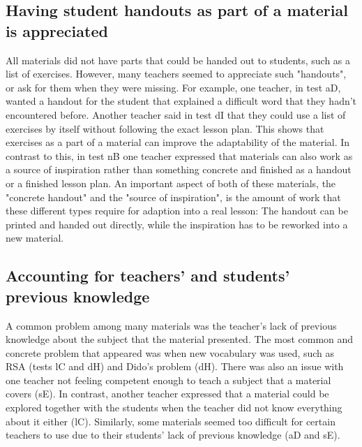 \subsection{Having student handouts as part of a material is appreciated} \label{handouts}
All materials did not have parts that could be handed out to students, such as a list of exercises. However, many teachers seemed to appreciate such "handouts", or ask for them when they were missing. For example, one teacher, in test aD, wanted a handout for the student that explained a difficult word that they hadn't encountered before. Another teacher said in test dI that they could use a list of exercises by itself without following the exact lesson plan. This shows that exercises as a part of a material can improve the adaptability of the material. In contrast to this, in test nB one teacher expressed that materials can also work as a source of inspiration rather than something concrete and finished as a handout or a finished lesson plan. An important aspect of both of these materials, the "concrete handout" and the "source of inspiration", is the amount of work that these different types require for adaption into a real lesson: The handout can be printed and handed out directly, while the inspiration has to be reworked into a new material.

\subsection{Accounting for teachers' and students' previous knowledge} \label{prevknowledge}
A common problem among many materials was the teacher's lack of previous knowledge about the subject that the material presented. The most common and concrete problem that appeared was when new vocabulary was used, such as RSA (tests lC and dH) and Dido's problem (dH). There was also an issue with one teacher not feeling competent enough to teach a subject that a material covers (sE). In contrast, another teacher expressed that a material could be explored together with the students when the teacher did not know everything about it either (lC). Similarly, some materials seemed too difficult for certain teachers to use due to their students' lack of previous knowledge (aD and sE).

